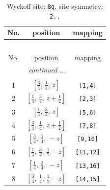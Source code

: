 \documentclass[fleqn,8pt]{jsarticle}
\begin{document}
\begin{longtable}{ccc}
\caption{Wyckoff site: {\tt 8g}, site symmetry: {\tt 2..}}
 \\
 \hline \hline
No. & position & mapping \\ \hline \endfirsthead

\multicolumn{2}{l}{\tablename\ \thetable{}} \\
 \hline \hline
No. & position & mapping \\ \hline \endhead

 \hline \hline
\multicolumn{2}{r}{\footnotesize\it continued ...} \\ \endfoot

 \hline \hline
\multicolumn{2}{r}{} \\ \endlastfoot

1 & $\left[ \frac{3}{4},\, \frac{1}{4},\, z \right]$ & {\tt [1,4]} \\ \hline
2 & $\left[ \frac{1}{4},\, \frac{3}{4},\, z + \frac{1}{2} \right]$ & {\tt [2,3]} \\ \hline
3 & $\left[ \frac{1}{4},\, \frac{3}{4},\, z \right]$ & {\tt [5,6]} \\ \hline
4 & $\left[ \frac{3}{4},\, \frac{1}{4},\, z + \frac{1}{2} \right]$ & {\tt [7,8]} \\ \hline
5 & $\left[ \frac{3}{4},\, \frac{1}{4},\, - z \right]$ & {\tt [9,10]} \\ \hline
6 & $\left[ \frac{1}{4},\, \frac{3}{4},\, \frac{1}{2} - z \right]$ & {\tt [11,12]} \\ \hline
7 & $\left[ \frac{1}{4},\, \frac{3}{4},\, - z \right]$ & {\tt [13,16]} \\ \hline
8 & $\left[ \frac{3}{4},\, \frac{1}{4},\, \frac{1}{2} - z \right]$ & {\tt [14,15]} \\
\end{longtable}
\renewcommand{\arraystretch}{1.2}
\end{document}
